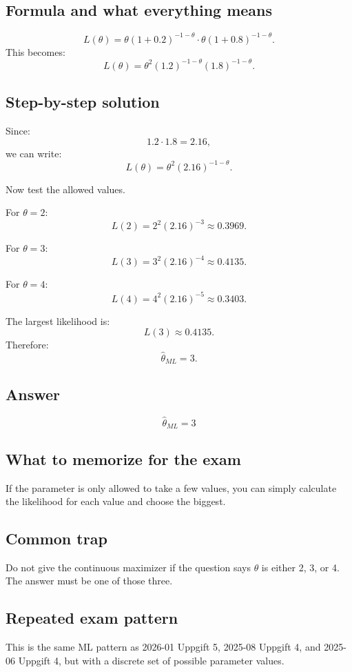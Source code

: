 \documentclass[11pt,a4paper]{article}
\begin{document}
\subsection*{Formula and what everything means}
\[
L(\theta)
=\theta(1+0.2)^{-1-\theta}\cdot \theta(1+0.8)^{-1-\theta}.
\]
This becomes:
\[
L(\theta)=\theta^2(1.2)^{-1-\theta}(1.8)^{-1-\theta}.
\]

\subsection*{Step-by-step solution}
Since:
\[
1.2\cdot 1.8=2.16,
\]
we can write:
\[
L(\theta)=\theta^2(2.16)^{-1-\theta}.
\]

Now test the allowed values.

For \(\theta=2\):
\[
L(2)=2^2(2.16)^{-3}\approx 0.3969.
\]

For \(\theta=3\):
\[
L(3)=3^2(2.16)^{-4}\approx 0.4135.
\]

For \(\theta=4\):
\[
L(4)=4^2(2.16)^{-5}\approx 0.3403.
\]

The largest likelihood is:
\[
L(3)\approx 0.4135.
\]
Therefore:
\[
\hat{\theta}_{ML}=3.
\]

\subsection*{Answer}
\[
\boxed{\hat{\theta}_{ML}=3}
\]

\subsection*{What to memorize for the exam}
If the parameter is only allowed to take a few values, you can simply calculate the likelihood for each value and choose the biggest.

\subsection*{Common trap}
Do not give the continuous maximizer if the question says \(\theta\) is either 2, 3, or 4. The answer must be one of those three.

\subsection*{Repeated exam pattern}
This is the same ML pattern as 2026-01 Uppgift 5, 2025-08 Uppgift 4, and 2025-06 Uppgift 4, but with a discrete set of possible parameter values.
\end{document}

